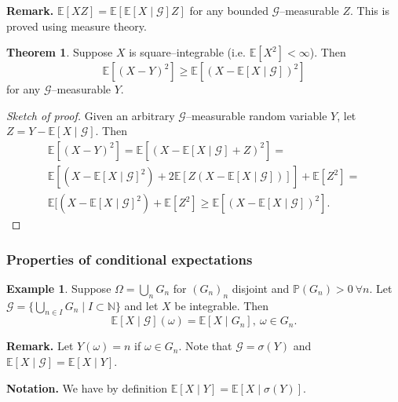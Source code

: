 \documentclass{article}
\theoremstyle{definition}
\newtheorem{theorem}{Theorem}[section]
\newtheorem{example}{Example}[section]
\begin{document}
\textbf{Remark.} $\mathbb{E}[XZ] = \mathbb{E}[\mathbb{E}[X \mid \mathcal{G}]Z]$ for any bounded $\mathcal{G}$--measurable $Z$. This is proved using measure theory.
\begin{theorem}
    Suppose $X$ is square--integrable (i.e. $\mathbb{E}[X^2]<\infty$). Then $$\mathbb{E}[(X-Y)^2] \ge \mathbb{E}[(X-\mathbb{E}[X \mid \mathcal{G}])^2]$$ for any $\mathcal{G}$--measurable $Y$.
\end{theorem}
\begin{proof}[Sketch of proof]
    Given an arbitrary $\mathcal{G}$--measurable random variable $Y$, let $Z = Y - \mathbb{E}[X \mid \mathcal{G}]$. Then
    \begin{align*}
        \mathbb{E}[(X-Y)^2] = \mathbb{E}[(X-\mathbb{E}[X \mid \mathcal{G}] + Z)^2] = \\ 
        \mathbb{E}[(X-\mathbb{E}[X \mid \mathcal{G}]^2) + 2\mathbb{E}[Z(X-\mathbb{E}[X \mid \mathcal{G}])]] + \mathbb{E}[Z^2] = \\
        \mathbb{E}[(X-\mathbb{E}[X \mid \mathcal{G}]^2) + \mathbb{E}[Z^2] \ge \mathbb{E}[(X- \mathbb{E}[X \mid  \mathcal{G}])^2].
    \end{align*}
\end{proof}


\subsubsection{Properties of conditional expectations} 

\begin{example}
    Suppose $\Omega = \bigcup_{n} G_n$ for $(G_n)_n$ disjoint and $\mathbb{P}(G_n)>0 ~\forall n$. Let ${\mathcal{G} = \{\bigcup_{n \in I} G_n \mid I \subset \mathbb{N}\}}$ and let $X$ be integrable. Then \[
    \mathbb{E}[X \mid \mathcal{G}](\omega) = \mathbb{E}[X \mid G_n], ~\omega \in G_n.
    \]
\end{example}
\textbf{Remark.} Let $Y(\omega) = n$ if $ \omega \in G_n$. Note that $\mathcal{G} = \sigma(Y)$ and $\mathbb{E}[X \mid \mathcal{G}] = \mathbb{E}[X \mid Y]$.
\vspace{1mm}

\textbf{Notation.} We have by definition $\mathbb{E}[X \mid Y] = \mathbb{E}[X \mid \sigma(Y)]$.
\end{document}
